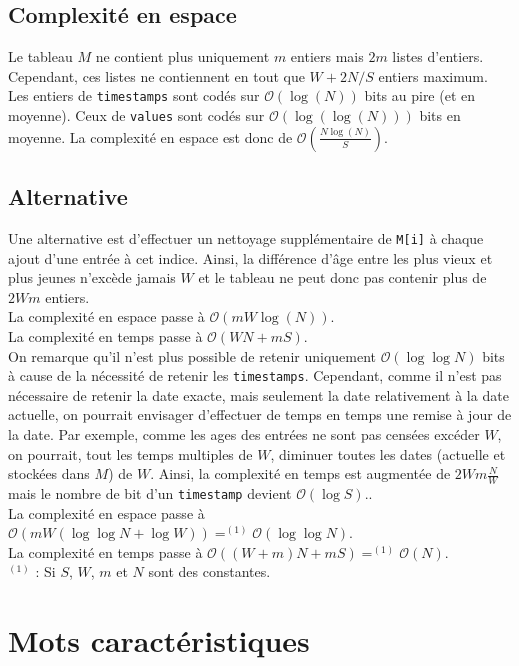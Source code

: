\documentclass[12pt,a4paper,titlepage]{article}
\newcommand{\class}[1]{\texttt{#1}}
\begin{document}
\subsection{Complexité en espace}
Le tableau $M$ ne contient plus uniquement $m$ entiers mais $2m$ listes d'entiers.\\
Cependant, ces listes ne contiennent en tout que $W+2N/S$ entiers maximum.
Les entiers de \class{timestamps} sont codés sur $\mathcal{O}(\log(N))$ bits au pire (et en moyenne).
Ceux de \class{values} sont codés sur $\mathcal{O}( \log(\log(N)) )$ bits en moyenne.
La complexité en espace est donc de $\mathcal{O}(\frac{N\log(N)}{S})$.

\subsection{Alternative}
Une alternative est d'effectuer un nettoyage supplémentaire de \class{M[i]} à chaque ajout d'une entrée à cet indice. Ainsi, la différence d'âge entre les plus vieux et plus jeunes n'excède jamais $W$ et le tableau ne peut donc pas contenir plus de $2Wm$ entiers.\\
La complexité en espace passe à $\mathcal{O}(mW\log(N))$.\\
La complexité en temps passe à  $\mathcal{O}(WN + mS)$.\\

On remarque qu'il n'est plus possible de retenir uniquement $\mathcal{O}(\log \log N)$ bits à cause de la nécessité de retenir les \class{timestamps}.
Cependant, comme il n'est pas nécessaire de retenir la date exacte, mais seulement la date relativement à la  date actuelle, on pourrait envisager d'effectuer de temps en temps une remise à jour de la date. Par exemple, comme les ages des entrées ne sont pas censées excéder $W$, on pourrait, tout les temps multiples de $W$, diminuer toutes les dates (actuelle et stockées dans $M$) de $W$. Ainsi, la complexité en temps est augmentée de $2Wm\frac{N}{W}$ mais le nombre de bit d'un \class{timestamp} devient $\mathcal{O}(\log S)$..\\
La complexité en espace passe à $\mathcal{O}(mW (\log \log N + \log W)) =^{(1)} \mathcal{O}(\log \log N)$.\\
La complexité en temps passe à $\mathcal{O}((W+m)N + mS) =^{(1)} \mathcal{O}(N)$.\\
$^{(1)}$ : Si $S$, $W$, $m$ et $N$ sont des constantes.

\newpage
\section{Mots caractéristiques}
\end{document}
